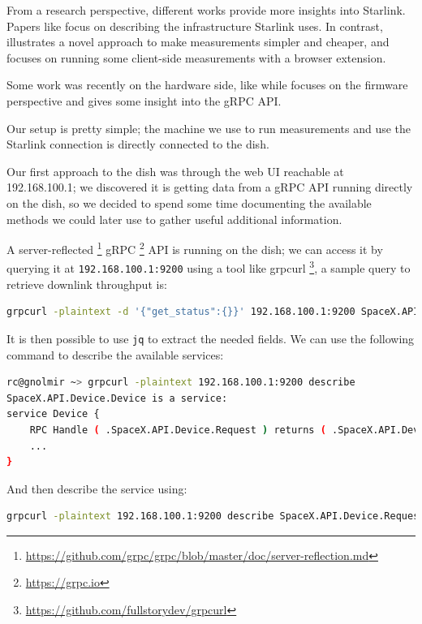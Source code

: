 \documentclass[IN,11pt,twoside,openright,idp,english]{tumthesis}
\begin{document}
From a research perspective, different works provide more insights into Starlink. Papers like \cite{pan2023measuring} focus on describing the infrastructure Starlink uses. In contrast, \cite{izhikevich2023democratizing} illustrates a novel approach to make measurements simpler and cheaper, and \cite{browser-side} focuses on running some client-side measurements with a browser extension.

Some work was recently on the hardware side, like \cite{glitching} while \cite{quarkslab} focuses on the firmware perspective and gives some insight into the gRPC API.



Our setup is pretty simple; the machine we use to run measurements and use the Starlink connection is directly connected to the dish.

Our first approach to the dish was through the web UI reachable at 192.168.100.1; we discovered it is getting data from a gRPC API running directly on the dish, so we decided to spend some time documenting the available methods we could later use to gather useful additional information.

A server-reflected \footnote{\url{https://github.com/grpc/grpc/blob/master/doc/server-reflection.md}} gRPC
\footnote{\url{https://grpc.io}} API is running on the dish; we can access it by querying it at \texttt{192.168.100.1:9200} using a tool like grpcurl \footnote{\url{https://github.com/fullstorydev/grpcurl}}, a sample query to retrieve downlink throughput is:

\begin{lstlisting}[language=bash,basicstyle=\tiny]
grpcurl -plaintext -d '{"get_status":{}}' 192.168.100.1:9200 SpaceX.API.Device.Device/Handle
\end{lstlisting}

It is then possible to use \texttt{jq} to extract the needed fields. We can use the following command to describe the available services:

\begin{lstlisting}[language=bash,basicstyle=\tiny]
rc@gnolmir ~> grpcurl -plaintext 192.168.100.1:9200 describe
SpaceX.API.Device.Device is a service:
service Device {
	RPC Handle ( .SpaceX.API.Device.Request ) returns ( .SpaceX.API.Device.Response );
	...
}
\end{lstlisting}

And then describe the service using:

\begin{lstlisting}[language=bash,basicstyle=\tiny]
grpcurl -plaintext 192.168.100.1:9200 describe SpaceX.API.Device.Request
\end{lstlisting}
\end{document}
